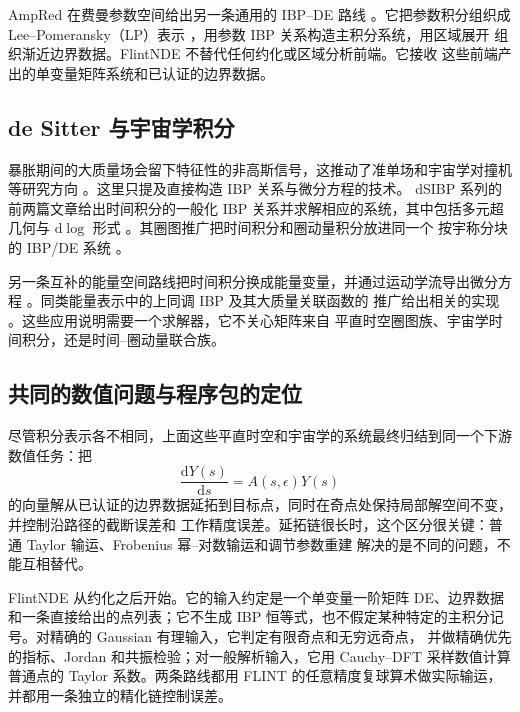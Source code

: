 \documentclass[11pt,a4paper]{ctexart}
\newcommand{\dd}{\mathrm d}
\newcommand{\eps}{\epsilon}
\renewcommand{\_}{\origunderscore\allowbreak}
\begin{document}
AmpRed 在费曼参数空间给出另一条通用的 IBP--DE 路线 \cite{Chen:2024xwt}。它把参数积分组织成
Lee--Pomeransky（LP）表示 \cite{Lee:2013hzt}，用参数 IBP 关系构造主积分系统，用区域展开
\cite{Beneke:1997zp,Pak:2010pt} 组织渐近边界数据。FlintNDE 不替代任何约化或区域分析前端。它接收
这些前端产出的单变量矩阵系统和已认证的边界数据。

\subsection{de Sitter 与宇宙学积分}

暴胀期间的大质量场会留下特征性的非高斯信号，这推动了准单场和宇宙学对撞机等研究方向
\cite{Chen:2009we,Chen:2009zp,Arkani-Hamed:2015bza}。这里只提及直接构造 IBP 关系与微分方程的技术。
dSIBP 系列的前两篇文章给出时间积分的一般化 IBP 关系并求解相应的系统，其中包括多元超几何与
$\mathrm d\log$ 形式 \cite{Chen:2023iix,Chen:2024glu}。其圈图推广把时间积分和圈动量积分放进同一个
按宇称分块的 IBP/DE 系统 \cite{Chen:2026dqp}。

另一条互补的能量空间路线把时间积分换成能量变量，并通过运动学流导出微分方程
\cite{Arkani-Hamed:2023kig,Arkani-Hamed:2023bsv}。同类能量表示中的上同调 IBP 及其大质量关联函数的
推广给出相关的实现 \cite{De:2023xue,Baumann:2026atn}。这些应用说明需要一个求解器，它不关心矩阵来自
平直时空圈图族、宇宙学时间积分，还是时间--圈动量联合族。

\subsection{共同的数值问题与程序包的定位}

尽管积分表示各不相同，上面这些平直时空和宇宙学的系统最终归结到同一个下游数值任务：把
\begin{equation}
  \frac{\dd Y(s)}{\dd s}=A(s,\eps)Y(s)
\end{equation}
的向量解从已认证的边界数据延拓到目标点，同时在奇点处保持局部解空间不变，并控制沿路径的截断误差和
工作精度误差。延拓链很长时，这个区分很关键：普通 Taylor 输运、Frobenius 幂--对数输运和调节参数重建
解决的是不同的问题，不能互相替代。

FlintNDE 从约化之后开始。它的输入约定是一个单变量一阶矩阵 DE、边界数据和一条直接给出的点列表；它不生成
IBP 恒等式，也不假定某种特定的主积分记号。对精确的 Gaussian 有理输入，它判定有限奇点和无穷远奇点，
并做精确优先的指标、Jordan 和共振检验；对一般解析输入，它用 Cauchy--DFT 采样数值计算普通点的 Taylor
系数。两条路线都用 FLINT 的任意精度复球算术做实际输运，并都用一条独立的精化链控制误差。
\end{document}
